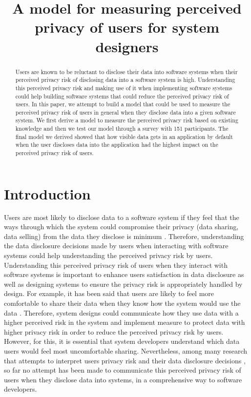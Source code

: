 \documentclass[10pt]{article}
\title{A model for measuring perceived privacy of users for system designers}
\date{}
\begin{document}
\maketitle
\begin{abstract}
Users are known to be reluctant to disclose their data into software systems when their perceived privacy risk of disclosing data into a software system is high. Understanding this perceived privacy risk and making use of it when implementing software systems could help building software systems that could reduce the perceived privacy risk of users. In this paper, we attempt to build a model that could be used to measure the perceived privacy risk of users in general when they disclose data into a given software system. We first derive a model to measure the perceived privacy risk based on existing knowledge and then we test our model through a survey with 151 participants. The final model we derived showed that how visible data gets in an application by default when the user discloses data into the application had the highest impact on the perceived privacy risk of users. 

\end{abstract}



\section{Introduction}



Users are most likely to disclose data to a software system if they feel that the ways through which the system could compromise their privacy (data sharing, data selling) from the data they disclose is minimum  \cite {kobsa2007privacy, li2010understanding, malhotra2004internet}. Therefore, understanding the data disclosure decisions made by users when interacting with software systems could help understanding the perceived privacy risk by users. Understanding this perceived privacy risk of users when they interact with software systems is important to enhance users satisfaction in data disclosure as well as designing systems to ensure the privacy risk is appropriately handled by design. For example, it has been said that users are likely to feel more comfortable to share their data when they know how the system would use the data \cite {knijnenburg2013helping}. Therefore, system designs could communicate how they use data with a higher perceived risk in the system and implement measure to protect data with higher privacy risk in order to reduce the perceived privacy risk by users. However, for this, it is essential that system developers understand which data users would feel most uncomfortable sharing. Nevertheless, among many research that attempts to interpret users privacy risk and their data disclosure decisions \cite {knijnenburg2013making, li2010understanding, wang2016context, malheiros2013fairly, dennett2000little}, so far no attempt has been made to communicate this perceived privacy risk of users when they disclose data into systems, in a comprehensive way to software developers.
\end{document}

